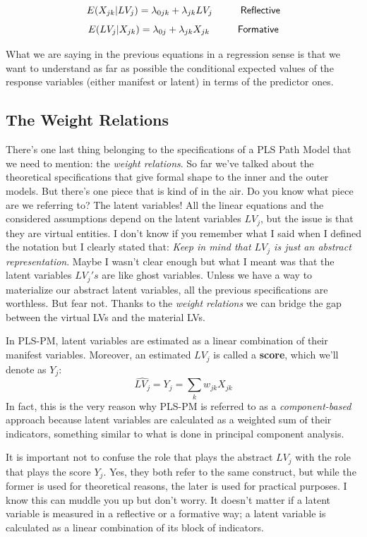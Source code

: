 \documentclass[12pt]{book}\usepackage{graphicx, color}
\begin{document}
$$ E(X_{jk} | LV_j) = \lambda_{0jk} + \lambda_{jk} LV_j  \hspace{10mm}  \mathsf{Reflective} $$
$$ E(LV_j | X_{jk}) = \lambda_{0j} + \lambda_{jk} X_{jk}  \hspace{10mm}  \mathsf{Formative}$$

What we are saying in the previous equations in a regression sense is that we want to understand as far as possible the conditional expected values of the response variables (either manifest or latent) in terms of the predictor ones.


\subsection{The Weight Relations}
There's one last thing belonging to the specifications of a PLS Path Model that we need to mention: the \textit{weight relations}. So far we've talked about the theoretical specifications that give formal shape to the inner and the outer models. But there's one piece that is kind of in the air. Do you know what piece are we referring to? The latent variables! All the linear equations and the considered assumptions depend on the latent variables $LV_j$, but the issue is that they are virtual entities. I don't know if you remember what I said when I defined the notation but I clearly stated that: \textit{Keep in mind that $LV_j$ is just an abstract representation}. Maybe I wasn't clear enough but what I meant was that the latent variables $LV_j's$ are like ghost variables. Unless we have a way to materialize our abstract latent variables, all the previous specifications are worthless. But fear not. Thanks to the \textit{weight relations} we can bridge the gap between the virtual LVs and the material LVs. 

In PLS-PM, latent variables are estimated as a linear combination of their manifest variables. Moreover, an estimated $LV_j$ is called a \textbf{score}, which we'll denote as $Y_j$:
$$\widehat{LV_j} = Y_j = \sum_{k} w_{jk} X_{jk}$$
In fact, this is the very reason why PLS-PM is referred to as a \textit{component-based} approach because latent variables are calculated as a weighted sum of their indicators, something similar to what is done in principal component analysis.

It is important not to confuse the role that plays the abstract $LV_j$ with the role that plays the score $Y_j$. Yes, they both refer to the same construct, but while the former is used for theoretical reasons, the later is used for practical purposes. I know this can muddle you up but don't worry.  It doesn't matter if a latent variable is measured in a reflective or a formative way; a latent variable is calculated as a linear combination of its block of indicators.
\end{document}
